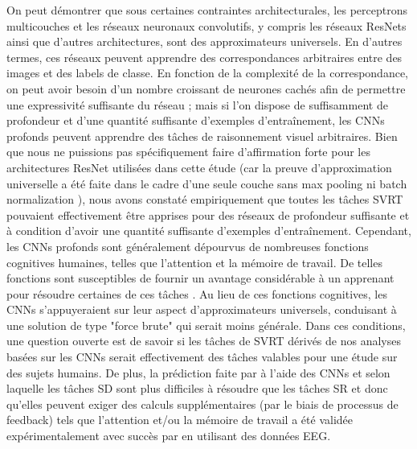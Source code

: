 On peut d\'emontrer que sous certaines contraintes architecturales, les perceptrons multicouches et les r\'eseaux neuronaux convolutifs, y compris les réseaux ResNets ainsi que d'autres architectures, sont des approximateurs universels. En d'autres termes, ces réseaux peuvent apprendre des correspondances arbitraires entre des images et des labels de classe. En fonction de la complexit\'e de la correspondance, on peut avoir besoin d'un nombre croissant de neurones cach\'es afin de permettre une expressivit\'e suffisante du r\'eseau ; mais si l'on dispose de suffisamment de profondeur et d'une quantit\'e suffisante d'exemples d'entraînement, les CNNs profonds peuvent apprendre des tâches de raisonnement visuel arbitraires. Bien que nous ne puissions pas spécifiquement faire d'affirmation forte pour les architectures ResNet utilis\'ees dans cette \'etude (car la preuve d'approximation universelle a été faite dans le cadre d'une seule couche sans max pooling ni batch normalization \citep{lin2018resnet}), nous avons constat\'e empiriquement que toutes les tâches SVRT pouvaient effectivement \^etre apprises pour des r\'eseaux de profondeur suffisante et \`a condition d'avoir une quantit\'e suffisante d'exemples d'entraînement.
Cependant, les CNNs profonds sont g\'en\'eralement d\'epourvus de nombreuses fonctions cognitives humaines, telles que l'attention et la m\'emoire de travail. De telles fonctions sont susceptibles de fournir un avantage considérable \`a un apprenant pour r\'esoudre certaines de ces tâches \citep{10.7551/mitpress/1187.001.0001}. Au lieu de ces fonctions cognitives, les CNNs s'appuyeraient sur leur aspect d'approximateurs universels, conduisant \`a une solution de type "force brute" qui serait moins g\'en\'erale. 
Dans ces conditions, une question ouverte est de savoir si les tâches de SVRT d\'eriv\'es de nos analyses bas\'ees sur les CNNs serait effectivement des tâches valables pour une \'etude sur des sujets humains. De plus, la pr\'ediction faite par \citet{kim2018not} \`a l'aide des CNNs et selon laquelle les tâches SD sont plus difficiles à résoudre que les tâches SR et donc qu'elles peuvent exiger des calculs suppl\'ementaires (par le biais de processus de feedback) tels que l'attention et/ou la m\'emoire de travail a \'et\'e valid\'ee exp\'erimentalement avec succ\`es par \citet{AlamiaENEURO.0267-20.2020} en utilisant des données EEG. 


